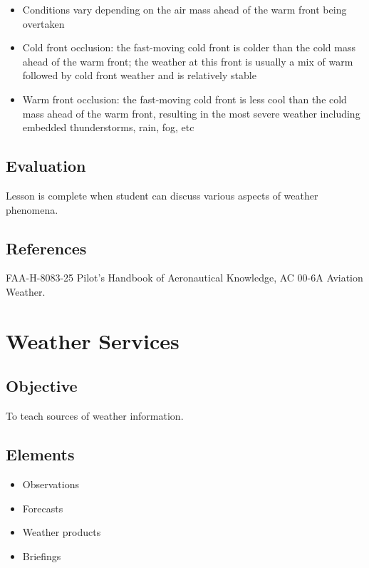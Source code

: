 \documentclass[twoside,openright]{report}
\begin{document}
\begin{itemize}
\begin{itemize}
      \item Conditions vary depending on the air mass ahead of the warm front
        being overtaken

      \item Cold front occlusion: the fast-moving cold front is colder than the
        cold mass ahead of the warm front; the weather at this front is usually
        a mix of warm followed by cold front weather and is relatively stable

      \item Warm front occlusion: the fast-moving cold front is less cool than
        the cold mass ahead of the warm front, resulting in the most severe
        weather including embedded thunderstorms, rain, fog, etc
    \end{itemize}
\end{itemize}

\section{Evaluation}

Lesson is complete when student can discuss various aspects of weather phenomena.

\section{References}

FAA-H-8083-25 Pilot's Handbook of Aeronautical Knowledge, AC 00-6A Aviation
Weather.

\chapter{Weather Services}

\section{Objective}

To teach sources of weather information.

\section{Elements}

\begin{itemize}
  \item Observations
  \item Forecasts
  \item Weather products
  \item Briefings
\end{itemize}
\end{document}
